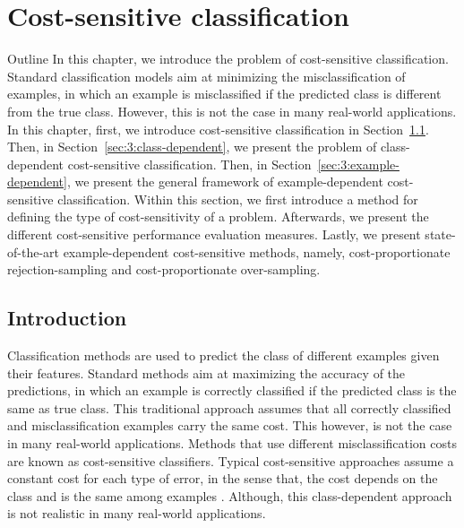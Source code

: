\chapter{Cost-sensitive classification}\label{ch:3}

\begin{remark}{Outline}
In this chapter, we introduce the problem of cost-sensitive classification. Standard 
classification models aim at minimizing the misclassification of examples, in which an example is 
misclassified if the predicted class is different from the true class. However, this is not the 
case in many real-world applications.
In this chapter, first, we introduce cost-sensitive classification in Section~\ref{sec:3:intro}. 
Then, in Section~\ref{sec:3:class-dependent}, we present the problem of 
class-dependent cost-sensitive classification. Then, in Section~\ref{sec:3:example-dependent}, we 
present the general framework of example-dependent cost-sensitive classification. Within this 
section, we first introduce a method for defining the type of cost-sensitivity of a problem. 
Afterwards, we present the different cost-sensitive performance evaluation measures. Lastly, we 
present state-of-the-art example-dependent cost-sensitive methods, namely,  cost-proportionate 
rejection-sampling 
and cost-proportionate over-sampling.
\end{remark}


\section{Introduction}
\label{sec:3:intro}

  Classification methods are used to predict the class of different examples given their features.
  Standard methods aim at maximizing the accuracy of the predictions, in which an example is 
  correctly classified if the predicted class is the same as true class. This traditional 
  approach assumes that all correctly classified and misclassification examples carry the same cost. 
  This however, is not the case in   many real-world applications.   Methods that use different 
  misclassification costs are known as cost-sensitive  classifiers. Typical cost-sensitive 
  approaches assume a constant cost for each type of error, in  the sense that, the cost depends on 
  the class and is the same among examples \citep{Elkan2001,Kim2012}. Although, this class-dependent 
  approach is not realistic in many   real-world applications.
  
